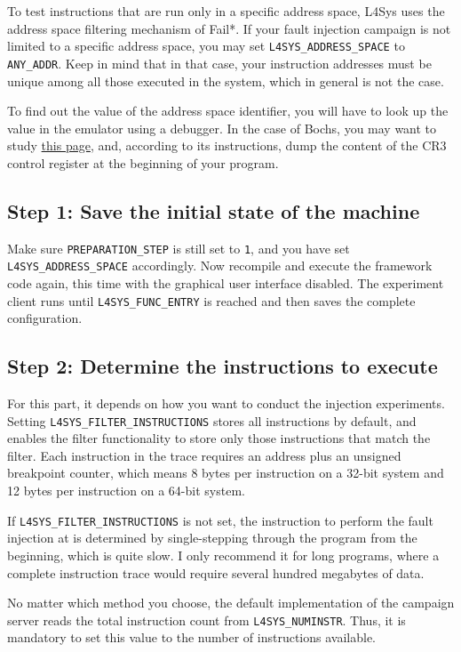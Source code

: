 \documentclass[a4paper,10pt]{article}
\begin{document}
To test instructions that are run only in a specific address space,
L4Sys uses the address space filtering mechanism of Fail*.
If your fault injection campaign is not limited to a specific address space,
you may set \verb+L4SYS_ADDRESS_SPACE+ to \verb+ANY_ADDR+. Keep in mind that in
that case, your instruction addresses must be unique among all those
executed in the system, which in general is not the case.

To find out the value of the address space identifier, you will have to
look up the value in
the emulator using a debugger. In the case of Bochs, you may want to
study
\href{http://bochs.sourceforge.net/doc/docbook/user/internal-debugger.html}{this page},
and, according to its instructions,
dump the content of the CR3 control register at the
beginning of your program.

\subsection{Step 1: Save the initial state of the machine}

Make sure \verb+PREPARATION_STEP+ is still set to \texttt{1}, and
you have set \verb+L4SYS_ADDRESS_SPACE+ accordingly.
Now recompile and execute the framework code again, this time with the graphical
user interface disabled. The experiment client runs until
\verb+L4SYS_FUNC_ENTRY+ is reached and then saves
the complete configuration.

\subsection{Step 2: Determine the instructions to execute}

For this part, it depends on how you want to conduct the injection
experiments. Setting \verb+L4SYS_FILTER_INSTRUCTIONS+
stores all instructions by default, and
enables the filter functionality to store only those
instructions that match the filter.
Each instruction in the trace requires
an address plus an unsigned breakpoint counter,
which means 8 bytes per instruction on a 32-bit system
and 12 bytes per instruction on a 64-bit system.

If \verb+L4SYS_FILTER_INSTRUCTIONS+ is not set, the instruction
to perform the fault injection at is determined by single-stepping
through the program from the beginning, which is quite slow.
I only recommend it for long programs, where a complete
instruction trace would require several hundred megabytes of data.

No matter which method you choose, the default implementation
of the campaign server reads the total instruction count
from \verb+L4SYS_NUMINSTR+. Thus, it is mandatory to set this
value to the number of instructions available.
\end{document}
